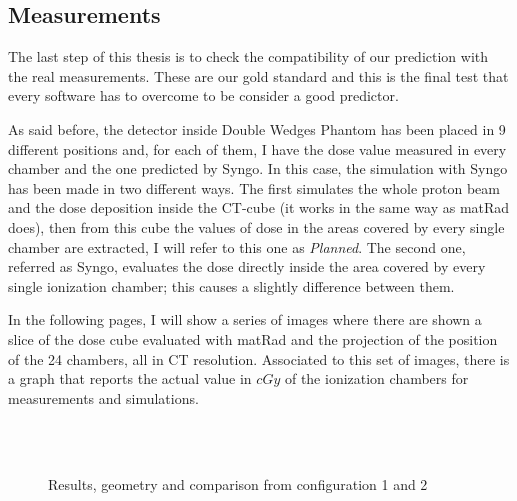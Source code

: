 \documentclass[12pt, a4paper, twoside]{book}
\begin{document}
\subsection{Measurements}
The last step of this thesis is to check the compatibility of our prediction with the real measurements. These are our gold standard and this is the final test that every software has to overcome to be consider a good predictor.

As said before, the detector inside Double Wedges Phantom has been placed in 9 different positions and, for each of them, I have the dose value measured in every chamber and the one predicted by Syngo. In this case, the simulation with Syngo has been made in two different ways. The first simulates the whole proton beam and the dose deposition inside the CT-cube (it works in the same way as matRad does), then from this cube the values of dose in the areas covered by every single chamber are extracted, I will refer to this one as \emph{Planned}. The second one, referred as Syngo, evaluates the dose directly inside the area covered by every single ionization chamber; this causes a slightly difference between them.

In the following pages, I will show a series of images where there are shown a slice of the dose cube evaluated with matRad and the projection of the position of the 24 chambers, all in CT resolution. Associated to this set of images, there is a graph that reports the actual value in $cGy$ of the ionization chambers for measurements and simulations.

\newpage
\begin{figure}[h!]
\centering
{} \quad
{}\\
 \\
 \quad
{} \quad
\caption{Results, geometry and comparison from configuration 1 and 2}
\label{fig:pos12}
\end{figure}
\end{document}
